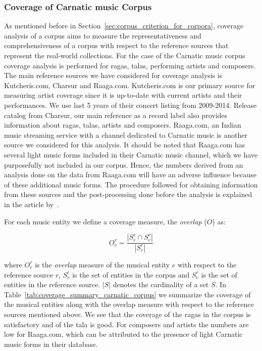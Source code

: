\subsubsection{Coverage of Carnatic music Corpus}
\label{sec:corpus_coverage_of_carnatic_music_corpus}

As mentioned before in Section~\ref{sec:corpus_criterion_for_corpora}, coverage analysis of a corpus aims to measure the representativeness and comprehensiveness of a corpus with respect to the reference sources that represent the real-world collections. For the case of the Carnatic music corpus coverage analysis is performed for \glspl{raga}, \glspl{tala}, performing artists and composers. The main reference sources we have considered for coverage analysis is Kutcheris.com, Charsur and Raaga.com. Kutcheris.com is our primary source for measuring artist coverage since it is up-to-date with current artists and their performances. We use last 5 years of their concert listing from 2009-2014. Release catalog from Charsur, our main reference as a record label also provides information about \glspl{raga}, \glspl{tala}, artists and composers. Raaga.com, an Indian music streaming service with a channel dedicated to Carnatic music is another source we considered for this analysis. It should be noted that Raaga.com has several light music forms included in their Carnatic music channel, which we have purposefully not included in our corpus. Hence, the numbers derived from an analysis done on the data from Raaga.com will have an adverse influence because of these additional music forms. The procedure followed for obtaining information from these sources and the post-processing done before the analysis is explained in the article by~\cite{CM_Corpora_Ajay14}.

For each music entity we define a coverage measure, the \textit{overlap} ($O$) as:

\begin{equation}
	O_{e}^{r} = \frac{ | S_{e}^{c} \cap S_{e}^{r} | }{ | S_{e}^{r} |}
	\label{eq:coverage_measure}
\end{equation}

\noindent where $O_{e}^{r}$ is the \textit{overlap} measure of the musical entity $e$ with respect to the reference source $r$, $S_{e}^{c}$ is the set of entities in the corpus and $S_{e}^{r}$ is the set of entities in the reference source. $|S|$ denotes the cardinality of a set $S$. In Table~\ref{tab:coverage_summary_carnatic_corpus} we summarize the coverage of the musical entities along with the overlap measure with respect to the reference sources mentioned above. We see that the coverage of the \glspl{raga} in the corpus is satisfactory and of the \gls{tala} is good. For composers and artists the numbers are low for Raaga.com, which can be attributed to the presence of light Carnatic music forms in their database. 

